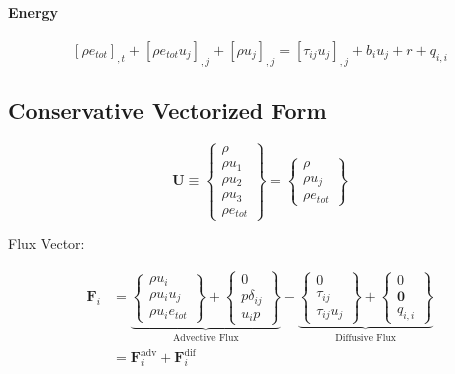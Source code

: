\documentclass[12pt, letterpaper, twoside]{article}
\newcommand{\etot}{e_{tot}}
\renewcommand{\vec}[1]{\bm{#1}}
\newcommand{\U}{\vec{U}}
\newcommand{\F}{\vec{F}}
\begin{document}
    \paragraph{Energy}
        \begin{equation}\label{eq:fund_energy}
            \left[\rho \etot \right]_{,t} + 
            \left[\rho \etot u_j \right]_{,j} + \left[\rho u_j \right]_{,j} 
            = \left[\tau_{ij} u_j \right]_{,j} + b_i u_j + r + q_{i,i}
        \end{equation}
    
    \subsection{Conservative Vectorized Form}

    \begin{equation}
        \U \equiv
        \begin{Bmatrix}
            \rho \\
            \rho u_1 \\
            \rho u_2 \\
            \rho u_3 \\
            \rho \etot
        \end{Bmatrix}
        =
        \begin{Bmatrix}
            \rho \\
            \rho u_j \\
            \rho \etot
        \end{Bmatrix}
    \end{equation}

    Flux Vector:

    \begin{equation}
        \begin{split}
        \F_i & = 
        \underbrace{
        \begin{Bmatrix}
            \rho u_i \\
            \rho u_i u_j \\
            \rho u_i \etot
        \end{Bmatrix}
        + \begin{Bmatrix}
            0 \\
            p \delta_{ij}\\
            u_i p
        \end{Bmatrix} }_{\text{Advective Flux}}
        - \underbrace{ \begin{Bmatrix}
            0 \\
            \tau_{ij}\\
            \tau_{ij} u_j 
        \end{Bmatrix}
        + \begin{Bmatrix}
            0 \\
            \vec{0} \\
            q_{i,i}
        \end{Bmatrix} }_{\text{Diffusive Flux}} \\
        & = \F_i^{\text{adv}} + \F_i^{\text{dif}}
        \end{split}
    \end{equation}
\end{document}
